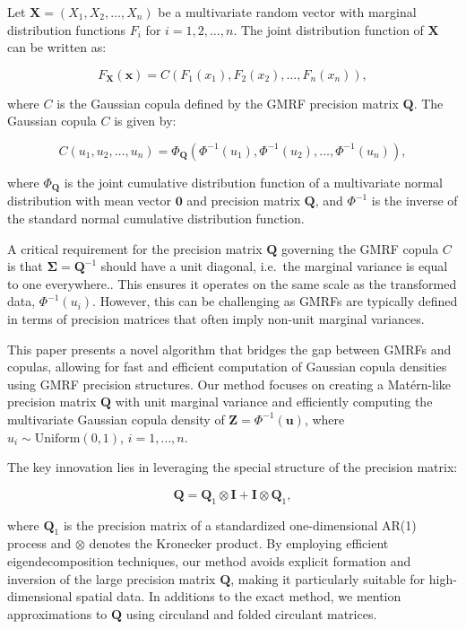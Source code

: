 \documentclass[journal=,manuscript=]{achemso}
\begin{document}
Let \(\mathbf{X} = (X_1, X_2, \ldots, X_n)\) be a multivariate random
vector with marginal distribution functions \(F_i\) for
\(i = 1, 2, \ldots, n\). The joint distribution function of
\(\mathbf{X}\) can be written as:

\[
F_{\mathbf{X}}(\mathbf{x}) = C(F_1(x_1), F_2(x_2), \ldots, F_n(x_n)),
\]

where \(C\) is the Gaussian copula defined by the GMRF precision matrix
\(\mathbf{Q}\). The Gaussian copula \(C\) is given by:

\[
C(u_1, u_2, \ldots, u_n) = \Phi_\mathbf{Q}(\Phi^{-1}(u_1), \Phi^{-1}(u_2), \ldots, \Phi^{-1}(u_n)),
\]

where \(\Phi_\mathbf{Q}\) is the joint cumulative distribution function
of a multivariate normal distribution with mean vector \(\mathbf{0}\)
and precision matrix \(\mathbf{Q}\), and \(\Phi^{-1}\) is the inverse of
the standard normal cumulative distribution function.

A critical requirement for the precision matrix \(\mathbf{Q}\) governing
the GMRF copula \(C\) is that \(\mathbf{\Sigma} = \mathbf{Q}^{-1}\)
should have a unit diagonal, i.e.~the marginal variance is equal to one
everywhere.. This ensures it operates on the same scale as the
transformed data, \(\Phi^{-1}(u_i)\). However, this can be challenging
as GMRFs are typically defined in terms of precision matrices that often
imply non-unit marginal variances.

This paper presents a novel algorithm that bridges the gap between GMRFs
and copulas, allowing for fast and efficient computation of Gaussian
copula densities using GMRF precision structures. Our method focuses on
creating a Matérn-like precision matrix \(\mathbf{Q}\) with unit
marginal variance and efficiently computing the multivariate Gaussian
copula density of \(\mathbf{Z} = \Phi^{-1}(\mathbf{u})\), where
\(u_i \sim \text{Uniform}(0, 1)\), \(i = 1, \dots, n\).

The key innovation lies in leveraging the special structure of the
precision matrix:

\[
\mathbf{Q} = \mathbf{Q}_1 \otimes \mathbf{I} + \mathbf{I} \otimes \mathbf{Q}_1,
\]

where \(\mathbf{Q}_1\) is the precision matrix of a standardized
one-dimensional AR(1) process and \(\otimes\) denotes the Kronecker
product. By employing efficient eigendecomposition techniques, our
method avoids explicit formation and inversion of the large precision
matrix \(\mathbf{Q}\), making it particularly suitable for
high-dimensional spatial data. In additions to the exact method, we
mention approximations to \(\mathbf{Q}\) using circuland and folded
circulant matrices.
\end{document}
